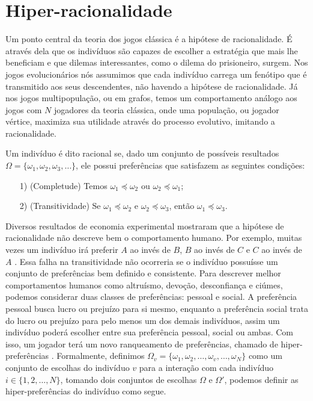 \chapter{Hiper-racionalidade} \label{chap:hiperRacionalidade}

Um ponto central da teoria dos jogos clássica é a hipótese de racionalidade. É através dela que os indivíduos são capazes de escolher a estratégia que mais lhe beneficiam e que dilemas interessantes, como o dilema do prisioneiro, surgem. Nos jogos evolucionários nós assumimos que cada indivíduo carrega um fenótipo que é transmitido aos seus descendentes, não havendo a hipótese de racionalidade. Já nos jogos multipopulação, ou em grafos, temos um comportamento análogo aos jogos com $N$ jogadores da teoria clássica, onde uma população, ou jogador vértice, maximiza sua utilidade através do processo evolutivo, imitando a racionalidade.

\begin{definition}
    \label{defRacionalidade}
    Um indivíduo é dito racional se, dado um conjunto de possíveis resultados $\Omega=\{\omega_1,\omega_2,\omega_3,\dots\}$, ele possui preferências que satisfazem as seguintes condições:
    \begin{itemize}
        \item[1)] (Completude) Temos $\omega_1\preceq\omega_2$ ou $\omega_2\preceq\omega_1$;
        \item[2)] (Transitividade) Se $\omega_1\preceq\omega_2$ e $\omega_2\preceq\omega_3$, então $\omega_1\preceq\omega_3$.
    \end{itemize}
\end{definition}

Diversos resultados de economia experimental mostraram que a hipótese de racionalidade não descreve bem o comportamento humano. Por exemplo, muitas vezes um indivíduo irá preferir $A$ ao invés de $B$, $B$ ao invés de $C$ e $C$ ao invés de $A$ \cite{sep-game-evolutionary}. Essa falha na transitividade não ocorreria se o indivíduo possuísse um conjunto de preferências bem definido e consistente. Para descrever melhor comportamentos humanos como altruísmo, devoção, desconfiança e ciúmes, podemos considerar duas classes de preferências: pessoal e social. A preferência pessoal busca lucro ou prejuízo para si mesmo, enquanto a preferência social trata do lucro ou prejuízo para pelo menos um dos demais indivíduos, assim um indivíduo poderá escolher entre sua preferência pessoal, social ou ambas. Com isso, um jogador terá um novo ranqueamento de preferências, chamado de hiper-preferências \cite{askari2019behavioral}. Formalmente, definimos $\Omega_v=\{\omega_1,\omega_2,\dots,\omega_v,\dots,\omega_N\}$ como um conjunto de escolhas do indivíduo $v$ para a interação com cada indivíduo $i\in\{1,2,\dots,N\}$, tomando dois conjuntos de escolhas $\Omega$ e $\Omega'$, podemos definir as hiper-preferências do indivíduo como segue.

